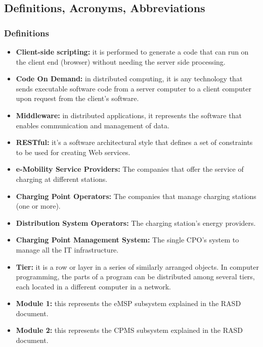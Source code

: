 \subsection{Definitions, Acronyms, Abbreviations}
\subsubsection{Definitions}
\begin{itemize}
    \item \textbf{Client-side scripting:} it is performed to generate a code that can run on the client end (browser) without needing the server side processing.
    \item \textbf{Code On Demand:} in distributed computing, it is any technology that sends executable software code from a server computer to a client computer upon request from the client's software.
    \item \textbf{Middleware:} in distributed applications, it represents the software that enables communication and management of data.
    \item \textbf{RESTful:} it's a software architectural style that defines a set of constraints to be used for creating Web services.
    \item \textbf{e-Mobility Service Providers:} The companies that offer the service of charging at different stations.
    \item \textbf{Charging Point Operators:} The companies that manage charging stations (one or more).\label{CPO}
    \item \textbf{Distribution System Operators:} The charging station's energy providers.\label{DSO}
    \item \textbf{Charging Point Management System:} The single CPO's system to manage all the IT infrastructure.
    \item \textbf{Tier:} it is a row or layer in a series of similarly arranged objects. In computer programming, the parts of a program can be distributed among several tiers, each located in a different computer in a network.
    \item \textbf{Module 1:} this represents the eMSP subsystem explained in the RASD document.
    \item \textbf{Module 2:} this represents the CPMS subsystem explained in the RASD document.
\end{itemize}

